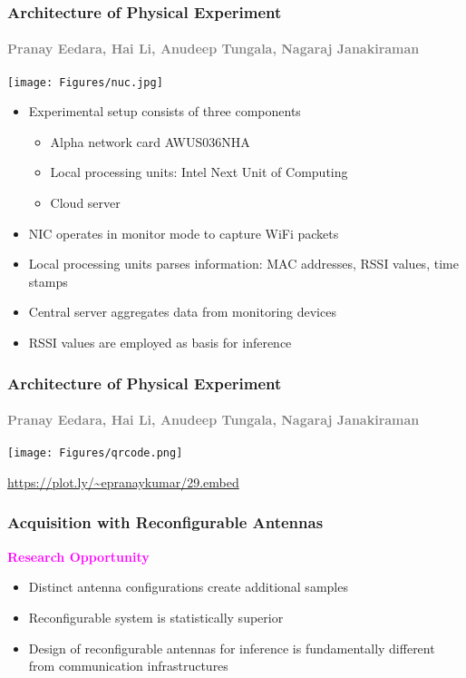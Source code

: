 \documentclass{beamer}
\begin{document}
\begin{frame}
\frametitle{Architecture of Physical Experiment}
\framesubtitle{\textcolor{gray}{\scriptsize Pranay Eedara, Hai Li, Anudeep Tungala, Nagaraj Janakiraman}}
\begin{center}
  \texttt{[image: Figures/nuc.jpg]}
\end{center}
\begin{itemize}
\item Experimental setup consists of three components
  \begin{itemize}
  \item Alpha network card AWUS036NHA
  \item Local processing units: Intel Next Unit of Computing
  \item Cloud server
  \end{itemize}
\item NIC operates in monitor mode to capture WiFi packets
\item Local processing units parses information: MAC addresses, RSSI values, time stamps
\item Central server aggregates data from monitoring devices
\item RSSI values are employed as basis for inference
 \end{itemize}
\end{frame}

\begin{frame}
\frametitle{Architecture of Physical Experiment}
\framesubtitle{\textcolor{gray}{\scriptsize Pranay Eedara, Hai Li, Anudeep Tungala, Nagaraj Janakiraman}}
\begin{center}
  \texttt{[image: Figures/qrcode.png]}
\end{center}
\begin{center}
    \url{https://plot.ly/~epranaykumar/29.embed}
\end{center}
\end{frame}



\begin{frame}
\frametitle{Acquisition with Reconfigurable Antennas}
\begin{block}{\textcolor{magenta}{\textbf{Research Opportunity}}}
\begin{itemize}
  \item Distinct antenna configurations create additional samples
  \item Reconfigurable system is statistically superior
  \item Design of reconfigurable antennas for inference is fundamentally different from communication infrastructures
\end{itemize}
\end{block}
\begin{center}
  
\end{center}
\end{frame}
\end{document}
